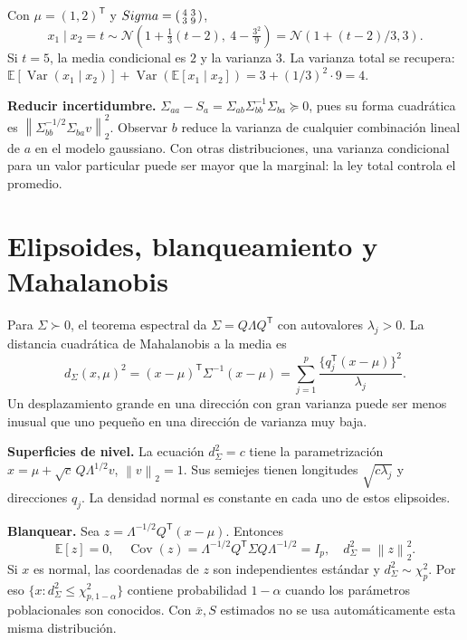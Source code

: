 \documentclass[11pt,a4paper]{article}
\newcommand{\E}{\mathbb E}
\newcommand{\T}{^{\mathsf T}}
\newcommand{\norm}[1]{\left\lVert #1\right\rVert}
\DeclareMathOperator{\Var}{Var}
\DeclareMathOperator{\Cov}{Cov}
\newcommand{\Normal}{\mathcal N}
\newcommand{\topic}[2]{\clearpage\section{#1}\label{#2}}
\theoremstyle{definition}\newtheorem{definicion}[teorema]{Definición}
\begin{document}
\begin{ejemplo}
Con $\mu=(1,2)\T$ y
$\Sigma=\begin{psmallmatrix}4&3\\3&9\end{psmallmatrix}$,
\[
x_1\mid x_2=t\sim\Normal\!\left(
1+\tfrac13(t-2),\ 4-\tfrac{3^2}{9}
\right)=\Normal(1+(t-2)/3,3).
\]
Si $t=5$, la media condicional es $2$ y la varianza $3$.
La varianza total se recupera:
$\E[\Var(x_1\mid x_2)]+\Var(\E[x_1\mid x_2])
=3+(1/3)^2\cdot9=4$.
\end{ejemplo}
\textbf{Reducir incertidumbre.}
$\Sigma_{aa}-S_a=\Sigma_{ab}\Sigma_{bb}^{-1}\Sigma_{ba}\succeq0$,
pues su forma cuadrática es
$\norm{\Sigma_{bb}^{-1/2}\Sigma_{ba}v}_2^2$.
Observar $b$ reduce la varianza de cualquier combinación lineal de $a$
en el modelo gaussiano. Con otras distribuciones, una varianza condicional
para un valor particular puede ser mayor que la marginal: la ley total
controla el promedio.

\topic{Elipsoides, blanqueamiento y Mahalanobis}{s22}
Para $\Sigma\succ0$, el teorema espectral da
$\Sigma=Q\Lambda Q\T$ con autovalores $\lambda_j>0$.
La distancia cuadrática de Mahalanobis a la media es
\[
d_\Sigma(x,\mu)^2=(x-\mu)\T\Sigma^{-1}(x-\mu)
=\sum_{j=1}^p\frac{\{q_j\T(x-\mu)\}^2}{\lambda_j}.
\]
Un desplazamiento grande en una dirección con gran varianza puede ser
menos inusual que uno pequeño en una dirección de varianza muy baja.

\textbf{Superficies de nivel.} La ecuación $d_\Sigma^2=c$ tiene la
parametrización $x=\mu+\sqrt c\,Q\Lambda^{1/2}v$, $\norm v_2=1$.
Sus semiejes tienen longitudes $\sqrt{c\lambda_j}$ y direcciones $q_j$.
La densidad normal es constante en cada uno de estos elipsoides.

\textbf{Blanquear.} Sea $z=\Lambda^{-1/2}Q\T(x-\mu)$. Entonces
\[
\E[z]=0,\quad
\Cov(z)=\Lambda^{-1/2}Q\T\Sigma Q\Lambda^{-1/2}=I_p,
\quad d_\Sigma^2=\norm z_2^2.
\]
Si $x$ es normal, las coordenadas de $z$ son independientes estándar y
$d_\Sigma^2\sim\chi^2_p$. Por eso
$\{x:d_\Sigma^2\le \chi^2_{p,1-\alpha}\}$ contiene probabilidad $1-\alpha$
cuando los parámetros poblacionales son conocidos.
Con $\bar x,S$ estimados no se usa automáticamente esta misma distribución.
\end{document}
